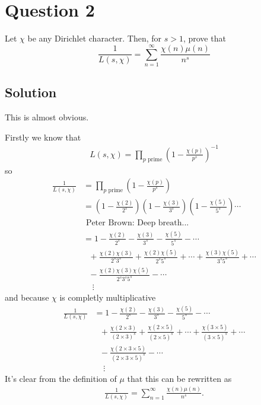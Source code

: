\documentclass{unswmaths}
\begin{document}
\section*{Question 2}
Let $ \chi $ be any Dirichlet character. Then, for $ s > 1 $, prove that
$$
	\frac{1}{L(s, \chi)} = \sum_{n=1}^\infty \frac{\chi(n)\mu(n)}{n^s}
$$
\subsection*{Solution}
This is almost obvious.

Firstly we know that 
\begin{align*}
	L(s,\chi) = \prod_{p \text{ prime}} \left( 1 - \frac{\chi(p)}{p^s} \right)^{-1}
\end{align*}
so 
\begin{align*}
	\frac{1}{L(s,\chi)} &= \prod_{p \text{ prime}} \left( 1 - \frac{\chi(p)}{p^s} \right) \\
		&= \left( 1 - \frac{\chi(2)}{2^s}\right) \left( 1 - \frac{\chi(3)}{3^s}\right)\left( 1 - \frac{\chi(5)}{5^s}\right)\cdots \\
		&\text{ Peter Brown: Deep breath...} \\
		&= 1 - \frac{\chi(2)}{2^s} - \frac{\chi(3)}{3^s} - \frac{\chi(5)}{5^s} - \cdots \\
		& \ \ \ + \frac{\chi(2)\chi(3)}{2^s3^s} + \frac{\chi(2)\chi(5)}{2^s5^s} + \cdots + \frac{\chi(3)\chi(5)}{3^s5^s} + \cdots \\
		& \ \ \ - \frac{\chi(2)\chi(3)\chi(5)}{2^s3^s5^s} - \cdots \\
		& \ \ \ \ \ \vdots
\end{align*}
and because $ \chi $ is completly multiplicative
\begin{align*}
	\frac{1}{L(s,\chi)}
		&= 1 - \frac{\chi(2)}{2^s} - \frac{\chi(3)}{3^s} - \frac{\chi(5)}{5^s} - \cdots \\
		& \ \ \ + \frac{\chi(2 \times 3)}{(2\times 3)^s} + \frac{\chi(2\times 5)}{(2 \times 5)^s} + \cdots + \frac{\chi(3 \times 5)}{(3 \times 5)^s} + \cdots \\
		& \ \ \ - \frac{\chi(2 \times 3 \times 5)}{(2 \times 3 \times 5)^s} - \cdots \\
		& \ \ \ \ \ \vdots
\end{align*}
It's clear from the definition of $ \mu $ that this can be rewritten as
\begin{align*}
	\frac{1}{L(s,\chi)} = \sum_{n=1}^\infty \frac{\chi(n)\mu(n)}{n^s}.
\end{align*}
\end{document}
